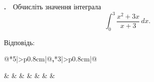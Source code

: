 \documentclass[12pt]{article}
\makeatletter
\newlength{\nmtcellw}
\newcommand{\nmtSetCell}{\setlength{\nmtcellw}{\dimexpr(\linewidth-10\tabcolsep-6\arrayrulewidth)/5\relax}}
\newcommand{\nmtAnswerBox}{%
\par\nopagebreak\vspace{0.2cm}\noindent
Відповідь:\ \
\begin{tabular}{@{}*{4}{|>{\centering\arraybackslash}p{0.8cm}}|@{\hspace{0.1cm}\textbf{,}\hspace{0.1cm}}*{3}{|>{\centering\arraybackslash}p{0.8cm}}|@{}}
\hline
\rule[-0.2cm]{0pt}{0.7cm} & & & & & & \\
\hline
\end{tabular}
\par\vspace{0.3cm}
}
\newcommand{\matchingGrid}{%
    \sbox{\nmtgridbox}{\matchingGridRaw}%
    \ifdim\wd\nmtgridbox>\linewidth \resizebox{\linewidth}{!}{\usebox{\nmtgridbox}}\else\usebox{\nmtgridbox}\fi}
\newcommand{\matchingGridRaw}{%
    \begingroup
    \renewcommand{\arraystretch}{1.15}
    \setlength{\tabcolsep}{4pt}
    \footnotesize
    \begin{tabular}{r|c|c|c|c|c|}
         \multicolumn{1}{c}{} & \multicolumn{1}{c}{\textbf{А}} & \multicolumn{1}{c}{\textbf{Б}} & \multicolumn{1}{c}{\textbf{В}} & \multicolumn{1}{c}{\textbf{Г}} & \multicolumn{1}{c}{\textbf{Д}} \\ \cline{2-6}
         \textbf{1} & \phantom{X} & \phantom{X} & \phantom{X} & \phantom{X} & \phantom{X} \\ \cline{2-6}
         \textbf{2} & & & & & \\ \cline{2-6}
         \textbf{3} & & & & & \\ \cline{2-6}
    \end{tabular}
    \endgroup
}
\newcounter{zad}
\newcommand{\zadtask}[1]{\stepcounter{zad}\noindent\textbf{\thezad.}\ \ #1\par\nopagebreak\vspace{0.2cm}}
\newcounter{ans}
\renewcommand{\nmtAnswerBox}{%
\par\nopagebreak\vspace{0.2cm}\noindent
Відповідь:\ \
\begin{tabular}{@{}*{5}{|>{\centering\arraybackslash}p{0.8cm}}|@{\hspace{0.1cm}\textbf{,}\hspace{0.1cm}}*{3}{|>{\centering\arraybackslash}p{0.8cm}}|@{}}
\hline
\rule[-0.2cm]{0pt}{0.7cm} & & & & & & & \\
\hline
\end{tabular}
\par\vspace{0.3cm}
}
\makeatother
\begin{document}
\providecommand{\trigStyle}[1]{#1}
\providecommand{\answerTableSmall}[5]{%
\begingroup\setlength{\tabcolsep}{2pt}\small\nmtSetCell
\begin{tabular}{|*{5}{>{\centering\arraybackslash}m{\nmtcellw}|}}
\hline
\rule[-0.2cm]{0pt}{0.6cm}\textbf{А} & \textbf{Б} & \textbf{В} & \textbf{Г} & \textbf{Д} \\
\hline
\rule[-0.4cm]{0pt}{0.9cm}#1 & \rule[-0.4cm]{0pt}{0.9cm}#2 & \rule[-0.4cm]{0pt}{0.9cm}#3 & \rule[-0.4cm]{0pt}{0.9cm}#4 & \rule[-0.4cm]{0pt}{0.9cm}#5 \\
\hline
\end{tabular}\endgroup}
\providecommand{\matchingLayout}[3]{%
    \noindent
    \begin{minipage}[t]{0.36\textwidth}\vspace{0pt}\raggedright
        #1
    \end{minipage}%
    \hfill
    \begin{minipage}[t]{0.43\textwidth}\vspace{0pt}\raggedright
        #2
    \end{minipage}%
    \hfill
    \begin{minipage}[t]{0.19\textwidth}
        \vspace{0pt}
        \begin{flushright}
        #3
        \end{flushright}
    \end{minipage}}
\providecommand{\matchingLayoutBottom}[2]{%
    \noindent
    \begin{minipage}[t]{0.48\textwidth}\vspace{0pt}\raggedright
        #1
    \end{minipage}%
    \hfill
    \begin{minipage}[t]{0.48\textwidth}\vspace{0pt}\raggedright
        #2
    \end{minipage}
    \vspace{0.5cm}
    \noindent
    \matchingGrid}
\providecommand{\answerListVertical}[5]{%
    \par\nopagebreak\vspace{0.2cm}
    \begin{itemize}[itemsep=0.4cm, leftmargin=1.5cm, labelsep=0.5cm]
        \item[\textbf{А}] #1
        \item[\textbf{Б}] #2
        \item[\textbf{В}] #3
        \item[\textbf{Г}] #4
        \item[\textbf{Д}] #5
    \end{itemize}
    \vspace{0.2cm}}
\begin{samepage}
\zadtask{Обчисліть значення інтеграла
\[ \int_0^3 \frac{x^2 + 3x}{x + 3} \,dx. \]
\nmtAnswerBox}

\par{}
\end{samepage}
\endgroup
\end{document}
